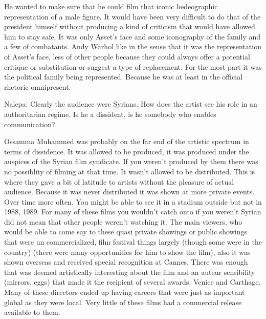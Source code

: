 \documentclass{article}
\begin{document}
\vspace{5mm}

He wanted to make sure that he could film that iconic hedeographic representation of a male figure.  It would have been very difficult to do that of the president himself without producing a kind of criticism that would have allowed him to stay safe.  It was only Asset's face and some iconography of the family and a few of combatants.  Andy Warhol like in the sense that it was the representation of Asset's face, less of other people because they could always offer a potential critique or substitution or suggest a type of replacement.  For the most part it was the political family being represented.  Because he was at least in the official rhetoric omnipresent.  

\vspace{5mm}

Nalepa: Clearly the audience were Syrians.  How does the artist see his role in an authoritarian regime.  Is he a dissident, is he somebody who enables communication?  

\vspace{5mm}

Ossamma Muhammed was probably on the far end of the artistic spectrum in terms of dissidence.  It was allowed to be produced, it was produced under the auspices of the Syrian film syndicate.  If you weren't produced by them there was no possiblity of filming at that time.  It wasn't allowed to be distributed.  This is where they gave a bit of latitude to artists without the pleasure of actual audience.  Because it was never distributed it was shown at more private events.  Over time more often.  You might be able to see it in a stadium outside but not in 1988, 1989.  For many of these films you wouldn't catch onto if you weren't Syrian did not mean that other people weren't watching it.  The main viewers, who would be able to come say to these quasi private showings or public showings that were un commercialized, film festival things largely (though some were in the country) (there were many opportunities for him to show the film), also it was shown overseas and received special recognition at Cannes.  There was enough that was deemed artistically interesting about the film and an auteur sensibility (mirrors, eggs) that made it the recipient of several awards.  Venice and Carthage.  Many of these directors ended up having careers that were just as important global as they were local.  Very little of these films had a commercial release available to them.  
\end{document}
